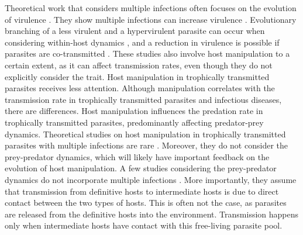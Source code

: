 \documentclass[a4paper]{scrartcl}
\begin{document}
Theoretical work that considers multiple infections often focuses on the evolution of virulence \citep{vanBaalen1995, Alizon2013, Alizon2008, Choisy2010, Alizon2012}. 
They show multiple infections can increase virulence \citep{vanBaalen1995, Choisy2010}.
Evolutionary branching of a less virulent and a hypervirulent parasite can occur when considering within-host dynamics \citep{ Alizon2008}, and a reduction in virulence is possible if parasites are co-transmitted \citep{Alizon2012}. 
These studies also involve host manipulation to a certain extent, as it can affect transmission rates, even though they do not explicitly consider the trait. 
Host manipulation in trophically transmitted parasites receives less attention. 
Although manipulation correlates with the transmission rate in trophically transmitted parasites and infectious diseases, there are differences. 
Host manipulation influences the predation rate in trophically transmitted parasites, predominantly affecting predator-prey dynamics. 
Theoretical studies on host manipulation in trophically transmitted parasites with multiple infections are rare \citep{Parker2003,Vickery2009}. 
Moreover, they do not consider the prey-predator dynamics, which will likely have important feedback on the evolution of host manipulation. 
A few studies considering the prey-predator dynamics do not incorporate multiple infections \citep{Rogawa2018, Iritani2018, Hadeler1989, Fenton2006}. 
More importantly, they assume that transmission from definitive hosts to intermediate hosts is due to direct contact between the two types of hosts. 
This is often not the case, as parasites are released from the definitive hosts into the environment. 
Transmission happens only when intermediate hosts have contact with this free-living parasite pool.
\end{document}
